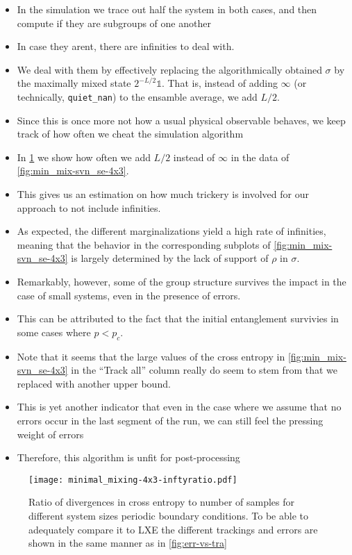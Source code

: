 \begin{itemize}
  \item In the simulation we trace out half the system in both cases, and then
    compute if they are subgroups of one another
  \item In case they arent, there are infinities to deal with.
  \item We deal with them by effectively replacing the algorithmically obtained
    $\sigma$ by the maximally mixed state $2^{-L /2} \mathds{1}$. That is,
    instead of adding $\infty$ (or technically, \texttt{quiet\_nan}) to the
    ensamble average, we add $L /2$.
  \item Since this is once more not how a usual physical observable behaves, we
    keep track of how often we cheat the simulation algorithm
  \item In \cref{fig:min_mix-inftyratio-4x3} we show how often we add $L /2$
    instead of $\infty$ in the data of \cref{fig:min_mix-svn_se-4x3}.
  \item This gives us an estimation on how much trickery is involved for our
    approach to not include infinities.
  \item As expected, the different marginalizations yield a high rate of
    infinities, meaning that the behavior in the corresponding subplots of \cref{fig:min_mix-svn_se-4x3} is
    largely determined by the lack of support of $\rho$ in $\sigma$.
  \item Remarkably, however, some of the group structure survives the impact in
    the case of small systems, even in the presence of errors.
  \item This can be attributed to the fact that the initial entanglement
    survivies in some cases where $p < p_c$.
  \item Note that it seems that the large values of the cross entropy in
    \cref{fig:min_mix-svn_se-4x3} in the \enquote{Track all} column really do
    seem to stem from that we replaced with another upper bound.
  \item This is yet another indicator that even in the case where we assume
    that no errors occur in the last segment of the run, we can still feel the
    pressing weight of errors
  \item Therefore, this algorithm is unfit for post-processing 
\end{itemize}

\begin{figure}[p]
  \centering
  \texttt{[image: minimal\_mixing-4x3-inftyratio.pdf]}
  \caption{Ratio of divergences in cross entropy to number of samples for
    different system sizes
  periodic boundary conditions. To be able to adequately compare it to LXE the
different trackings and errors are shown in the same manner as in
\cref{fig:err-vs-tra}}
  \label{fig:min_mix-inftyratio-4x3}
\end{figure}

